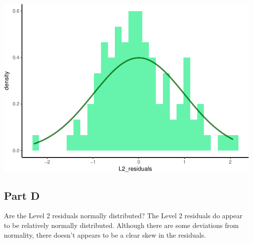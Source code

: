 \documentclass[]{article}
\newenvironment{Shaded}{\begin{snugshade}}{\end{snugshade}}
\newcommand{\KeywordTok}[1]{\textcolor[rgb]{0.13,0.29,0.53}{\textbf{#1}}}
\newcommand{\DataTypeTok}[1]{\textcolor[rgb]{0.13,0.29,0.53}{#1}}
\newcommand{\DecValTok}[1]{\textcolor[rgb]{0.00,0.00,0.81}{#1}}
\newcommand{\FloatTok}[1]{\textcolor[rgb]{0.00,0.00,0.81}{#1}}
\newcommand{\StringTok}[1]{\textcolor[rgb]{0.31,0.60,0.02}{#1}}
\newcommand{\OperatorTok}[1]{\textcolor[rgb]{0.81,0.36,0.00}{\textbf{#1}}}
\newcommand{\NormalTok}[1]{#1}
\begin{document}
\begin{Shaded}
\end{Shaded}

\includegraphics{Beck_HW_5_R_1_files/figure-latex/unnamed-chunk-10-1.pdf}

\subsection{Part D}\label{part-d-2}

Are the Level 2 residuals normally distributed? The Level 2 residuals do
appear to be relatively normally distributed. Although there are some
deviations from normality, there doesn't appears to be a clear skew in
the residuals.
\end{document}
